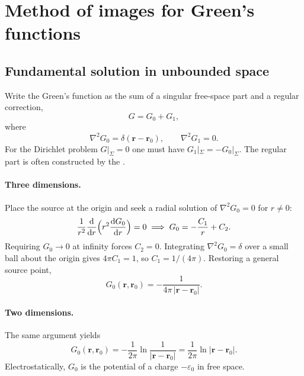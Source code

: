 \section{Method of images for Green's functions}

\subsection{Fundamental solution in unbounded space}

Write the Green's function as the sum of a singular free-space part and a regular correction,
\begin{equation}
G=G_0+G_1,
\end{equation}
where
\begin{equation}
\nabla^2 G_0=\delta(\mathbf{r}-\mathbf{r}_0),
\qquad
\nabla^2 G_1=0.
\end{equation}
For the Dirichlet problem $G|_{\Sigma}=0$ one must have $G_1|_{\Sigma}=-G_0|_{\Sigma}$. The regular part is often constructed by the .

\paragraph{Three dimensions.}
Place the source at the origin and seek a radial solution of $\nabla^2 G_0=0$ for $r\neq0$:
\begin{equation}
\frac{1}{r^2}\frac{\mathrm{d}}{\mathrm{d}r}\Bigl(r^2\frac{\mathrm{d}G_0}{\mathrm{d}r}\Bigr)=0
\implies
G_0=-\frac{C_1}{r}+C_2.
\end{equation}
Requiring $G_0\to0$ at infinity forces $C_2=0$. Integrating $\nabla^2 G_0=\delta$ over a small ball about the origin gives $4\pi C_1=1$, so $C_1=1/(4\pi)$. Restoring a general source point,
\begin{equation}
\label{eq:G0-3d}
G_0(\mathbf{r},\mathbf{r}_0)=-\frac{1}{4\pi\,|\mathbf{r}-\mathbf{r}_0|}.
\end{equation}

\paragraph{Two dimensions.}
The same argument yields
\begin{equation}
\label{eq:G0-2d}
G_0(\mathbf{r},\mathbf{r}_0)
=-\frac{1}{2\pi}\ln\frac{1}{|\mathbf{r}-\mathbf{r}_0|}
=\frac{1}{2\pi}\ln|\mathbf{r}-\mathbf{r}_0|.
\end{equation}
Electrostatically, $G_0$ is the potential of a charge $-\varepsilon_0$ in free space.

